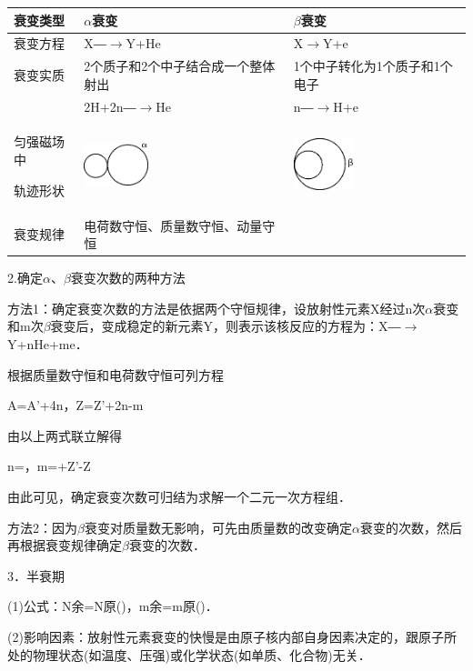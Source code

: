 \begin{longtable}[]{@{}m{2cm}m{5cm}m{5cm}@{}}
\toprule
衰变类型 & $\alpha$衰变 & $\beta$衰变\tabularnewline
\midrule
\endhead
衰变方程 & X―$\rightarrow$Y+He & X$\rightarrow$Y+e\tabularnewline
衰变实质 & 2个质子和2个中子结合成一个整体射出 &
1个中子转化为1个质子和1个电子\tabularnewline
& 2H+2n―$\rightarrow$He & n―$\rightarrow$H+e\tabularnewline
\begin{minipage}[t]{0.30\columnwidth}\raggedright
匀强磁场中

轨迹形状\strut
\end{minipage} & \begin{minipage}[t]{0.30\columnwidth}\raggedright
\includegraphics[width=0.73611in,height=0.49028in]{media/image480.png}\strut
\end{minipage} & \begin{minipage}[t]{0.30\columnwidth}\raggedright
\includegraphics[width=0.68889in,height=0.59444in]{media/image481.png}\strut
\end{minipage}\tabularnewline
衰变规律 & 电荷数守恒、质量数守恒、动量守恒 &\tabularnewline
\bottomrule
\end{longtable}

2.确定$\alpha$、$\beta$衰变次数的两种方法

方法1：确定衰变次数的方法是依据两个守恒规律，设放射性元素X经过n次$\alpha$衰变和m次$\beta$衰变后，变成稳定的新元素Y，则表示该核反应的方程为：X―$\rightarrow$Y+nHe+me．

根据质量数守恒和电荷数守恒可列方程

A=A'+4n，Z=Z'+2n-m

由以上两式联立解得

n=，m=+Z'-Z

由此可见，确定衰变次数可归结为求解一个二元一次方程组．

方法2：因为$\beta$衰变对质量数无影响，可先由质量数的改变确定$\alpha$衰变的次数，然后再根据衰变规律确定$\beta$衰变的次数．

3．半衰期

(1)公式：N余=N原()，m余=m原()．

(2)影响因素：放射性元素衰变的快慢是由原子核内部自身因素决定的，跟原子所处的物理状态(如温度、压强)或化学状态(如单质、化合物)无关．

